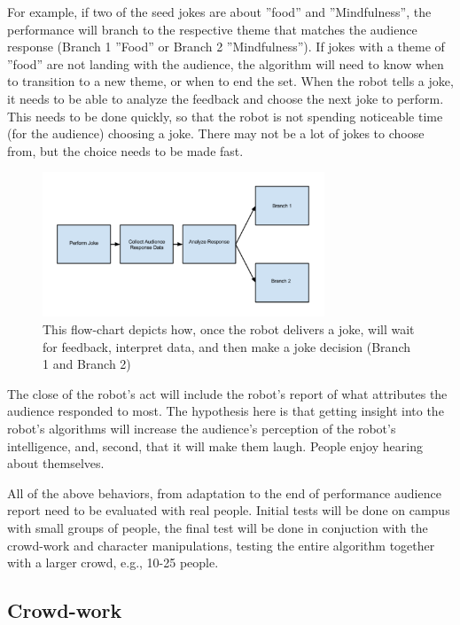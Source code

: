 \documentclass[onecolumn, draftclsnofoot,10pt, compsoc]{IEEEtran}
\begin{document}
For example, if two of the seed jokes are about ”food” and ”Mindfulness”, the performance will branch to the
respective theme that matches the audience response (Branch 1 ”Food” or Branch 2 ”Mindfulness”). If jokes with a
theme of ”food” are not landing with the audience, the algorithm will need to know when to transition to a new theme, or when to end the set. When the robot tells a joke, it needs to be able to analyze the feedback and choose the next joke
to perform. This needs to be done quickly, so that the robot is not spending noticeable time (for the audience) choosing
a joke. There may not be a lot of jokes to choose from, but the choice needs to be made fast.

\begin{figure}[H]
  \centering
  \includegraphics[width=0.75\textwidth,height=0.75\textheight,keepaspectratio]{fig1}
  \caption{ This flow-chart depicts how, once the robot delivers a joke, will wait for feedback, interpret data, and then make a joke decision (Branch 1 and Branch 2)}
  \label{fig:process}
\end{figure}

The close of the robot’s act will include the robot’s report of what attributes the audience
responded to most. The hypothesis here is that getting insight into the robot’s algorithms will increase the audience’s
perception of the robot’s intelligence, and, second, that it will make them laugh. People enjoy hearing about themselves.

All of the above behaviors, from adaptation to the end of performance audience report need to be evaluated with
real people. Initial tests will be done on campus with small groups of people, the final test will be done in conjuction
with the crowd-work and character manipulations, testing the entire algorithm together with a larger crowd, e.g., 10-25
people.


\subsection{Crowd-work}
\end{document}
